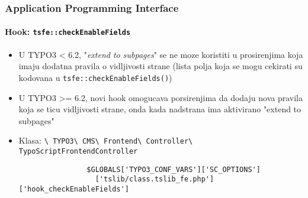 \begin{frame}[fragile]
	\frametitle{Application Programming Interface}
	\framesubtitle{Hook: \texttt{tsfe::checkEnableFields}}

	\begin{itemize}
		\item U TYPO3 < 6.2, "\emph{extend to subpages}" se ne moze koristiti u prosirenjima koja imaju dodatna pravila o vidljivosti strane\newline
			\small(lista polja koja se mogu cekirati su kodovana u \texttt{tsfe::checkEnableFields()})\normalsize

		\item U TYPO3 >= 6.2, novi hook omogucava porsirenjima da dodaju nova pravila koja se ticu vidljivosti strane, onda kada nadstrana ima aktivirano "extend to subpages"
		\item Klasa:\newline
			\smaller
				\texttt{\textbackslash
					TYPO3\textbackslash
					CMS\textbackslash
					Frontend\textbackslash
					Controller\textbackslash
					TypoScriptFrontendController}\normalsize

			\lstset{
				basicstyle=\smaller\ttfamily
			}

			\begin{lstlisting}
				$GLOBALS['TYPO3_CONF_VARS']['SC_OPTIONS']
				  ['tslib/class.tslib_fe.php']['hook_checkEnableFields']
			\end{lstlisting}

	\end{itemize}

\end{frame}


